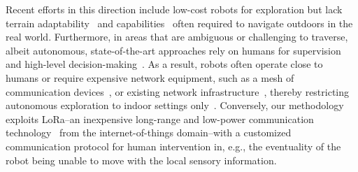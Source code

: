 \documentclass[lettersize,journal,twoside]{IEEEtran}
\theoremstyle{definition}
\begin{document}
Recent efforts in this direction include low-cost robots for exploration %
but lack terrain adaptability~\cite{muller2021openbot} and %
capabilities~\cite{zhou2021smartphone,faisal2021low} often required to navigate outdoors in the real world. %
%
Furthermore, in areas that are ambiguous or challenging to traverse, albeit autonomous, state-of-the-art approaches rely on humans for supervision and high-level decision-making~\cite{tranzatto2022cerberus,roucek2020darpa,tabib2022autonomous}. 
As a result, robots often operate close to humans or require expensive network equipment, such as a mesh of communication devices~\cite{kulkarni2022autonomous,ebadi2020lamp}, or existing network infrastructure~\cite{khairuldanial2019mobile,%
voigtlander20175g}, thereby restricting autonomous exploration to indoor settings only~\cite{delgado2022oros,
cadena2016past,eldemiry2022autonomous,corah2019communication
}.
Conversely, our methodology exploits LoRa--an inexpensive long-range and low-power communication technology~\cite{shanmuga2020survey} from the internet-of-things domain--with a customized communication protocol 
for human intervention in, e.g., the eventuality of the robot being unable to move with the local sensory information. 
\end{document}
